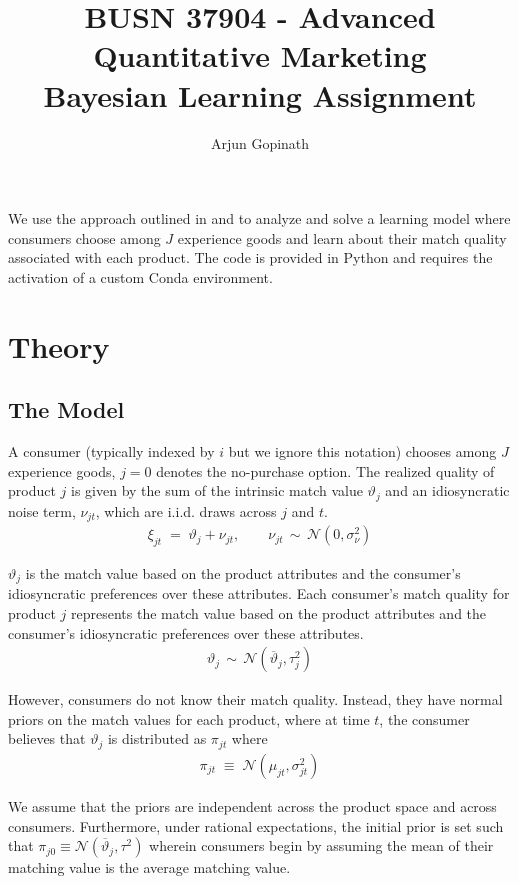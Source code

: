 \documentclass[11pt]{article}
\title{\LARGE \vspace{-1.5cm}\textbf{BUSN 37904 - Advanced Quantitative Marketing \\ Bayesian Learning Assignment}}
\author{\Large Arjun Gopinath}
\date{}
\newcommand{\N}{\mathcal{N}}
\begin{document}
\maketitle

\noindent We use the approach outlined in \citet{erdem_decision-making_1996} and \citet{crawford_uncertainty_2005} to analyze and solve a learning model where consumers choose among $J$ experience goods and learn about their match quality associated with each product. The code is provided in Python and requires the activation of a custom Conda environment.

\section{Theory}
\subsection*{The Model}
A consumer (typically indexed by $i$ but we ignore this notation) chooses among $J$ experience goods, $j=0$ denotes the no-purchase option. The realized quality of product $j$ is given by the sum of the intrinsic match value $\vartheta_{j}$ and an idiosyncratic noise term, $\nu_{j t}$, which are i.i.d. draws across $j$ and $t$.
\begin{gather*}
\xi_{j t} \; = \; \vartheta_{j}+\nu_{j t}, \qquad \nu_{j t} \, \sim \, \N\left(0, \sigma_{\nu}^{2}\right)
\end{gather*}

\noindent $\vartheta_{j}$ is the match value based on the product attributes and the consumer's idiosyncratic preferences over these attributes. Each consumer's match quality for product $j$ represents the match value based on the product attributes and the consumer's idiosyncratic preferences over these attributes.  
\begin{gather*}
    \vartheta_{j} \, \sim \, \N \left( \overline{\vartheta}_j, \tau^2_j \right)
\end{gather*}

\noindent However, consumers do not know their match quality. Instead, they have normal priors on the match values for each product, where at time $t$, the consumer believes that $\vartheta_j$ is distributed as $\pi_{jt}$ where
\begin{gather*}
\pi_{jt} \; \equiv \; \N\left(\mu_{j t}, \sigma_{jt}^{2}\right)
\end{gather*}

\noindent We assume that the priors are independent across the product space and across consumers. Furthermore, under rational expectations, the initial prior is set such that $\pi_{j 0} \equiv \N\left(\overline{\vartheta}_{j}, \tau^{2}\right)$ wherein consumers begin by assuming the mean of their matching value is the average matching value.\\
\end{document}
